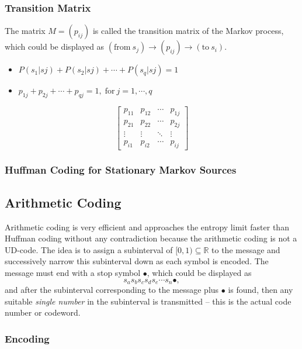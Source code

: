 \documentclass{article}
\begin{document}
\subsubsection{Transition Matrix}

The matrix $M = (p_{ij})$ is called the transition matrix of the Markov process, which could be displayed as $(\mathrm{from}\ s_{j}) \rightarrow (p_{ij}) \rightarrow (\mathrm{to}\ s_{i})$.

\begin{itemize}
    \item \quad $P(s_{1}|s{j}) + P(s_{2}|s{j}) + \cdots + P(s_{q}|s{j}) = 1$
    \item \quad $p_{1j} + p_{2j} + \cdots + p_{qj} = 1, \; \mathrm{for}\ j = 1, \cdots, q$
\end{itemize}

\[
\begin{bmatrix}
    p_{11} & p_{12} & \cdots & p_{1j} \\
    p_{21} & p_{22} & \cdots & p_{2j} \\
    \vdots & \vdots & \ddots & \vdots \\
    p_{i1} & p_{i2} & \cdots & p_{ij}
\end{bmatrix}
\]

\subsubsection{Huffman Coding for Stationary Markov Sources}

\subsection{Arithmetic Coding}

Arithmetic coding is very efficient and approaches the entropy limit faster than Huffman coding without any contradiction because the arithmetic coding is not a UD-code. The idea is to assign a subinterval of $[0, 1) \subseteq \mathbb{R}$ to the message and successively narrow this subinterval down as each symbol is encoded. The message must end with a stop symbol $\bullet$, which could be displayed as 
    \[s_{a}s_{b}s_{c}s_{d}s_{e} \cdots s_{n} \bullet,\]
    and after the subinterval corresponding to the message plus $\bullet$ is found, then any suitable \emph{single number} in the subinterval is transmitted -- this is the actual code number or codeword.

\subsubsection{Encoding}
\end{document}

